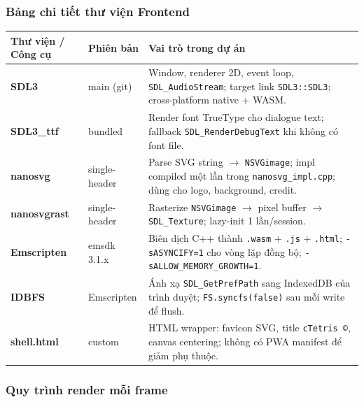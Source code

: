 \documentclass[12pt,a4paper]{article}
\begin{document}
\subsubsection{Bảng chi tiết thư viện Frontend}

\begin{tabularx}{\linewidth}{|l|l|X|}
  \hline
  \textbf{Thư viện / Công cụ} & \textbf{Phiên bản} & \textbf{Vai trò trong dự án} \\
  \hline
  \textbf{SDL3}       & main (git)   & Window, renderer 2D, event loop, \texttt{SDL\_AudioStream}; target link \texttt{SDL3::SDL3}; cross-platform native + WASM. \\
  \hline
  \textbf{SDL3\_ttf}  & bundled      & Render font TrueType cho dialogue text; fallback \texttt{SDL\_RenderDebugText} khi không có font file. \\
  \hline
  \textbf{nanosvg}    & single-header & Parse SVG string $\rightarrow$ \texttt{NSVGimage}; impl compiled một lần trong \texttt{nanosvg\_impl.cpp}; dùng cho logo, background, credit. \\
  \hline
  \textbf{nanosvgrast}& single-header & Rasterize \texttt{NSVGimage} $\rightarrow$ pixel buffer $\rightarrow$ \texttt{SDL\_Texture}; lazy-init 1 lần/session. \\
  \hline
  \textbf{Emscripten} & emsdk 3.1.x  & Biên dịch C++ thành \texttt{.wasm} + \texttt{.js} + \texttt{.html}; \texttt{-sASYNCIFY=1} cho vòng lặp đồng bộ; \texttt{-sALLOW\_MEMORY\_GROWTH=1}. \\
  \hline
  \textbf{IDBFS}      & Emscripten   & Ánh xạ \texttt{SDL\_GetPrefPath} sang IndexedDB của trình duyệt; \texttt{FS.syncfs(false)} sau mỗi write để flush. \\
  \hline
  \textbf{shell.html} & custom       & HTML wrapper: favicon SVG, title \texttt{cTetris ©}, canvas centering; không có PWA manifest để giảm phụ thuộc. \\
  \hline
\end{tabularx}

\subsubsection{Quy trình render mỗi frame}
\end{document}
